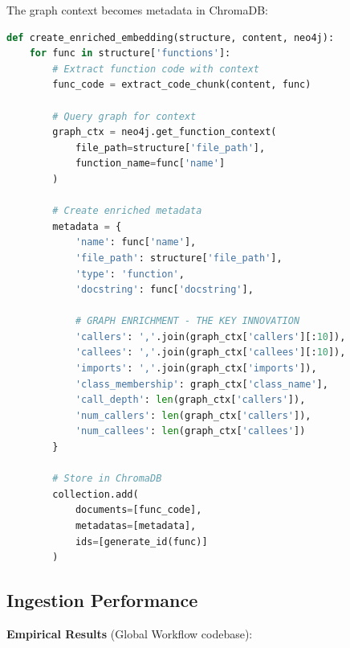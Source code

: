 \documentclass[11pt,letterpaper]{article}
\begin{document}
The graph context becomes metadata in ChromaDB:

\begin{lstlisting}[language=Python, caption=Enriched embedding creation]
def create_enriched_embedding(structure, content, neo4j):
    for func in structure['functions']:
        # Extract function code with context
        func_code = extract_code_chunk(content, func)
        
        # Query graph for context
        graph_ctx = neo4j.get_function_context(
            file_path=structure['file_path'],
            function_name=func['name']
        )
        
        # Create enriched metadata
        metadata = {
            'name': func['name'],
            'file_path': structure['file_path'],
            'type': 'function',
            'docstring': func['docstring'],
            
            # GRAPH ENRICHMENT - THE KEY INNOVATION
            'callers': ','.join(graph_ctx['callers'][:10]),
            'callees': ','.join(graph_ctx['callees'][:10]),
            'imports': ','.join(graph_ctx['imports']),
            'class_membership': graph_ctx['class_name'],
            'call_depth': len(graph_ctx['callers']),
            'num_callers': len(graph_ctx['callers']),
            'num_callees': len(graph_ctx['callees'])
        }
        
        # Store in ChromaDB
        collection.add(
            documents=[func_code],
            metadatas=[metadata],
            ids=[generate_id(func)]
        )
\end{lstlisting}

\subsection{Ingestion Performance}

\textbf{Empirical Results} (Global Workflow codebase):
\end{document}
